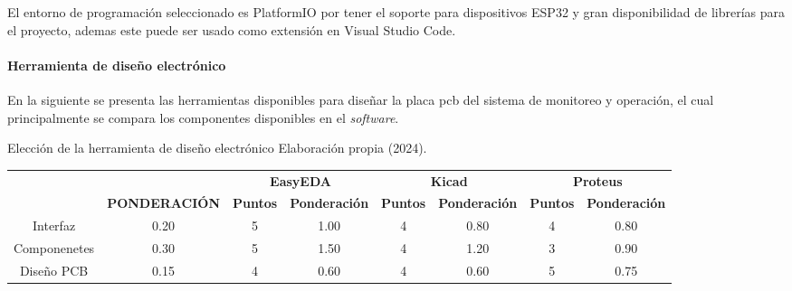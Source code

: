 El entorno de programación seleccionado es PlatformIO por tener el soporte para dispositivos ESP32 y gran disponibilidad de librerías para el proyecto, ademas este puede ser usado como extensión en Visual Studio Code.
\paragraph{Herramienta de diseño electrónico}
En la siguiente  se presenta las herramientas disponibles para diseñar la placa \acrshort{pcb} del sistema de monitoreo y operación, el cual principalmente se compara los componentes disponibles en el \textit{software}.
\begin{tabla}[disel] 
{Elección de la herramienta de diseño electrónico}
{Elaboración propia (2024).}
\centering
\resizebox{15cm}{!}
{
\begin{tabular}{|c|c|c|c|c|c|c|c|} 
\hline
\rowcolor[rgb]{0.678,0.702,0.698} {\cellcolor[rgb]{0.678,0.702,0.698}}                                    & {\cellcolor[rgb]{0.678,0.702,0.698}}                                       & \multicolumn{2}{c|}{\textbf{EasyEDA}}  & \multicolumn{2}{c|}{\textbf{Kicad}}    & \multicolumn{2}{c|}{\textbf{Proteus}}   \\
\rowcolor[rgb]{0.678,0.702,0.698} \multirow{-2}{*}{{\cellcolor[rgb]{0.678,0.702,0.698}}\textbf{CRITERIO}} & \multirow{-2}{*}{{\cellcolor[rgb]{0.678,0.702,0.698}}\textbf{PONDERACIÓN}} & \textbf{Puntos} & \textbf{Ponderación} & \textbf{Puntos} & \textbf{Ponderación} & \textbf{Puntos} & \textbf{Ponderación}  \\ 
\hline
\rowcolor[rgb]{0.027,0.894,0.675} Interfaz                                                                & 0.20                                                                       & 5               & 1.00                 & 4               & 0.80                 & 4               & 0.80                  \\ 
\hline
\rowcolor[rgb]{0.027,0.894,0.675} Componenetes                                                            & 0.30                                                                       & 5               & 1.50                 & 4               & 1.20                 & 3               & 0.90                  \\ 
\hline
Diseño PCB                                                                                                & 0.15                                                                       & 4               & 0.60                 & 4               & 0.60                 & 5               & 0.75                  \\ 

\end{tabular}}
\end{tabla}
